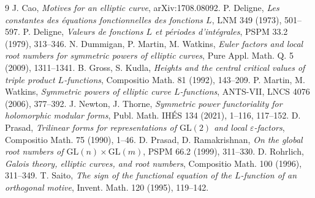 \documentclass[11pt]{article}
\newcommand{\eps}{\varepsilon}
\begin{document}
\begin{thebibliography}{9}
 J. Cao, \emph{Motives for an elliptic curve}, arXiv:1708.08092.
 P. Deligne, \emph{Les constantes des \'equations
fonctionnelles des fonctions $L$}, LNM 349 (1973), 501--597.
 P. Deligne, \emph{Valeurs de fonctions $L$ et p\'eriodes
d'int\'egrales}, PSPM 33.2 (1979), 313--346.
 N. Dummigan, P. Martin, M. Watkins, \emph{Euler factors and local root
numbers for symmetric powers of elliptic curves}, Pure Appl. Math. Q. 5 (2009),
1311--1341.
 B. Gross, S. Kudla, \emph{Heights and the central critical
values of triple product $L$-functions}, Compositio Math. 81 (1992), 143--209.
 P. Martin, M. Watkins, \emph{Symmetric powers of elliptic
curve $L$-functions}, ANTS-VII, LNCS 4076 (2006), 377--392.
 J. Newton, J. Thorne, \emph{Symmetric power functoriality
for holomorphic modular forms}, Publ. Math. IH\'ES 134 (2021), 1--116, 117--152.
 D. Prasad, \emph{Trilinear forms for representations of
$\mathrm{GL}(2)$ and local $\eps$-factors}, Compositio Math. 75 (1990), 1--46.
 D. Prasad, D. Ramakrishnan, \emph{On the global root numbers of
$\mathrm{GL}(n)\times\mathrm{GL}(m)$}, PSPM 66.2 (1999), 311--330.
 D. Rohrlich, \emph{Galois theory, elliptic curves, and root
numbers}, Compositio Math. 100 (1996), 311--349.
 T. Saito, \emph{The sign of the functional equation of the
$L$-function of an orthogonal motive}, Invent. Math. 120 (1995), 119--142.
\end{thebibliography}
\end{document}
